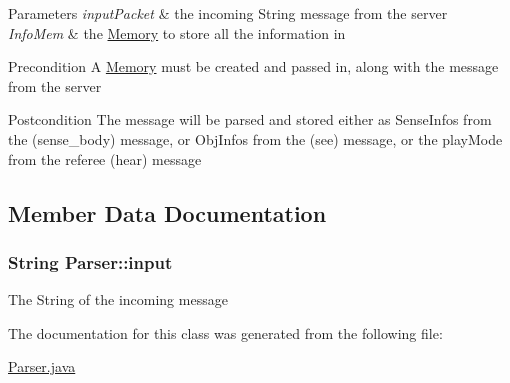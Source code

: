 \begin{DoxyParams}{Parameters}
{\em inputPacket} & the incoming String message from the server \\
\hline
{\em InfoMem} & the \hyperlink{classMemory}{Memory} to store all the information in \\
\hline
\end{DoxyParams}
\begin{DoxyPrecond}{Precondition}
A \hyperlink{classMemory}{Memory} must be created and passed in, along with the message from the server 
\end{DoxyPrecond}
\begin{DoxyPostcond}{Postcondition}
The message will be parsed and stored either as SenseInfos from the (sense\_\-body) message, or ObjInfos from the (see) message, or the playMode from the referee (hear) message 
\end{DoxyPostcond}


\subsection{Member Data Documentation}
\hypertarget{classParser_a7b23ca1da91ad5e2256afef7629901cd}{
\subsubsection[{input}]{\setlength{\rightskip}{0pt plus 5cm}String {\bf Parser::input}}}
\label{classParser_a7b23ca1da91ad5e2256afef7629901cd}
The String of the incoming message 

The documentation for this class was generated from the following file:\begin{DoxyCompactItemize}
\item 
\hyperlink{Parser_8java}{Parser.java}\end{DoxyCompactItemize}
